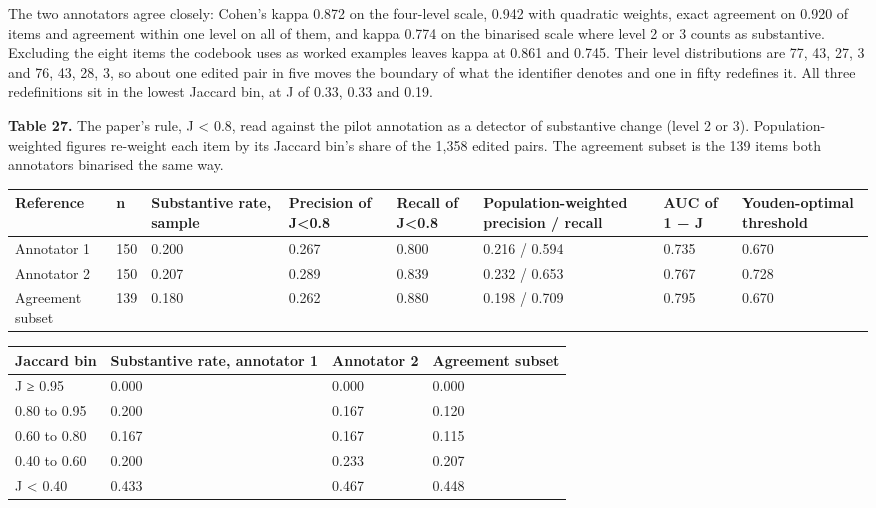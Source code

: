 \documentclass[11pt,a4paper]{article}
\begin{document}
The two annotators agree closely: Cohen's kappa 0.872 on the four-level scale, 0.942 with quadratic weights, exact agreement on 0.920 of items and agreement within one level on all of them, and kappa 0.774 on the binarised scale where level 2 or 3 counts as substantive. Excluding the eight items the codebook uses as worked examples leaves kappa at 0.861 and 0.745. Their level distributions are 77, 43, 27, 3 and 76, 43, 28, 3, so about one edited pair in five moves the boundary of what the identifier denotes and one in fifty redefines it. All three redefinitions sit in the lowest Jaccard bin, at J of 0.33, 0.33 and 0.19.

\textbf{Table 27.} The paper's rule, J < 0.8, read against the pilot annotation as a detector of substantive change (level 2 or 3). Population-weighted figures re-weight each item by its Jaccard bin's share of the 1,358 edited pairs. The agreement subset is the 139 items both annotators binarised the same way.

\begin{center}\footnotesize
\begin{tabular}{llllllll}
\toprule
Reference & n & Substantive rate, sample & Precision of J<0.8 & Recall of J<0.8 & Population-weighted precision / recall & AUC of 1 − J & Youden-optimal threshold \\
\midrule
Annotator 1 & 150 & 0.200 & 0.267 & 0.800 & 0.216 / 0.594 & 0.735 & 0.670 \\
Annotator 2 & 150 & 0.207 & 0.289 & 0.839 & 0.232 / 0.653 & 0.767 & 0.728 \\
Agreement subset & 139 & 0.180 & 0.262 & 0.880 & 0.198 / 0.709 & 0.795 & 0.670 \\
\bottomrule
\end{tabular}
\end{center}

\begin{center}\footnotesize
\begin{tabular}{llll}
\toprule
Jaccard bin & Substantive rate, annotator 1 & Annotator 2 & Agreement subset \\
\midrule
J ≥ 0.95 & 0.000 & 0.000 & 0.000 \\
0.80 to 0.95 & 0.200 & 0.167 & 0.120 \\
0.60 to 0.80 & 0.167 & 0.167 & 0.115 \\
0.40 to 0.60 & 0.200 & 0.233 & 0.207 \\
J < 0.40 & 0.433 & 0.467 & 0.448 \\
\bottomrule
\end{tabular}
\end{center}
\end{document}
